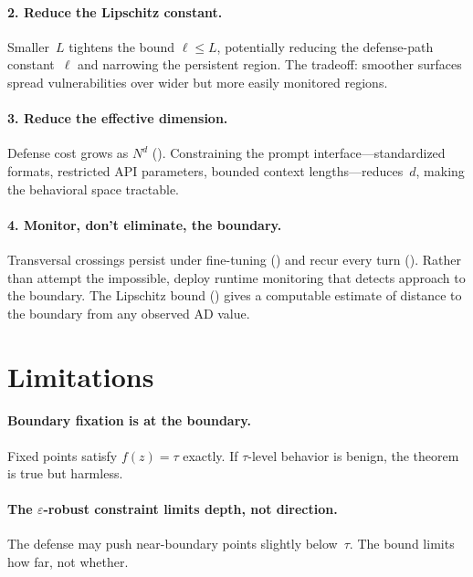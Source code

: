 \documentclass[11pt]{article}
\begin{document}
\paragraph{2. Reduce the Lipschitz constant.}
Smaller~$L$ tightens the bound $\ell \leq L$, potentially reducing
the defense-path constant~$\ell$ and narrowing the persistent region.
The tradeoff: smoother surfaces spread vulnerabilities over wider but
more easily monitored regions.

\paragraph{3. Reduce the effective dimension.}
Defense cost grows as $N^d$ (). Constraining the prompt
interface---standardized formats, restricted API parameters, bounded
context lengths---reduces~$d$, making the behavioral space tractable.

\paragraph{4. Monitor, don't eliminate, the boundary.}
Transversal crossings persist under fine-tuning ()
and recur every turn (). Rather than attempt the
impossible, deploy runtime monitoring that detects approach to the
boundary. The Lipschitz bound () gives a
computable estimate of distance to the boundary from any observed AD
value.

\section{Limitations}
\label{sec:limitations}

\paragraph{Boundary fixation is at the boundary.}
Fixed points satisfy $f(z) = \tau$ exactly. If $\tau$-level behavior
is benign, the theorem is true but harmless.

\paragraph{The $\varepsilon$-robust constraint limits depth, not direction.}
The defense may push near-boundary points slightly below~$\tau$. The
bound limits how far, not whether.
\end{document}
